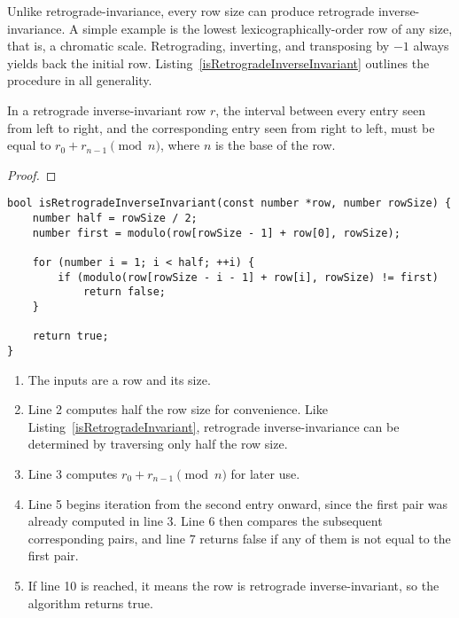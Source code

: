 Unlike retrograde-invariance, every row size can produce retrograde inverse-invariance. A simple example is the lowest lexicographically-order row of any size, that is, a chromatic scale. Retrograding, inverting, and transposing by $-1$ always yields back the initial row. Listing~\ref{isRetrogradeInverseInvariant} outlines the procedure in all generality.


\begin{lemma}
	\label{retrograde-inverse-invariance}
	In a retrograde inverse-invariant row $r$, the interval between every entry seen from left to right, and the corresponding entry seen from right to left, must be equal to $r_0 + r_{n - 1} \pmod{n}$, where $n$ is the base of the row.
	\begin{proof}
	\end{proof}
\end{lemma}

\begin{lstlisting}[caption={Determining whether a row is retrograde inverse-invariant.},label={isRetrogradeInverseInvariant}]
bool isRetrogradeInverseInvariant(const number *row, number rowSize) {
    number half = rowSize / 2;
    number first = modulo(row[rowSize - 1] + row[0], rowSize);

    for (number i = 1; i < half; ++i) {
        if (modulo(row[rowSize - i - 1] + row[i], rowSize) != first)
            return false;
    }

    return true;
}
\end{lstlisting}

\begin{enumerate}
\item The inputs are a row and its size.
\item Line 2 computes half the row size for convenience. Like Listing~\ref{isRetrogradeInvariant}, retrograde inverse-invariance can be determined by traversing only half the row size.
\item Line 3 computes $r_0 + r_{n - 1} \pmod{n}$ for later use.
\addtocounter{enumi}{1}
\item Line 5 begins iteration from the second entry onward, since the first pair was already computed in line 3. Line 6 then compares the subsequent corresponding pairs, and line 7 returns false if any of them is not equal to the first pair.
\addtocounter{enumi}{4}
\item If line 10 is reached, it means the row is retrograde inverse-invariant, so the algorithm returns true.
\end{enumerate}

